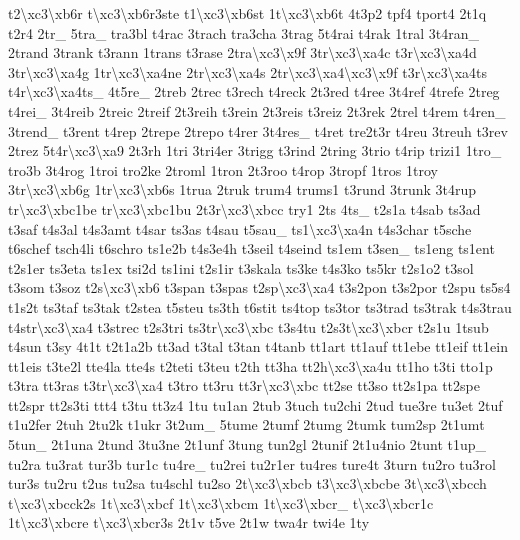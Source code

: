 {t2\textbackslash{}xc3\textbackslash{}xb6r t\textbackslash{}xc3\textbackslash{}xb6r3ste t1\textbackslash{}xc3\textbackslash{}xb6st 1t\textbackslash{}xc3\textbackslash{}xb6t 4t3p2 tpf4 tport4 2t1q t2r4 2tr\-\_\- 5tra\-\_\- tra3bl t4rac 3trach tra3cha 3trag 5t4rai t4rak 1tral 3t4ran\-\_\- 2trand 3trank t3rann 1trans t3rase 2tra\textbackslash{}xc3\textbackslash{}x9f 3tr\textbackslash{}xc3\textbackslash{}xa4c t3r\textbackslash{}xc3\textbackslash{}xa4d 3tr\textbackslash{}xc3\textbackslash{}xa4g 1tr\textbackslash{}xc3\textbackslash{}xa4ne 2tr\textbackslash{}xc3\textbackslash{}xa4s 2tr\textbackslash{}xc3\textbackslash{}xa4\textbackslash{}xc3\textbackslash{}x9f t3r\textbackslash{}xc3\textbackslash{}xa4ts t4r\textbackslash{}xc3\textbackslash{}xa4ts\-\_\- 4t5re\-\_\- 2treb 2trec t3rech t4reck 2t3red t4ree 3t4ref 4trefe 2treg t4rei\-\_\- 3t4reib 2treic 2treif 2t3reih t3rein 2t3reis t3reiz 2t3rek 2trel t4rem t4ren\-\_\- 3trend\-\_\- t3rent t4rep 2trepe 2trepo t4rer 3t4res\-\_\- t4ret tre2t3r t4reu 3treuh t3rev 2trez 5t4r\textbackslash{}xc3\textbackslash{}xa9 2t3rh 1tri 3tri4er 3trigg t3rind 2tring 3trio t4rip trizi1 1tro\-\_\- tro3b 3t4rog 1troi tro2ke 2troml 1tron 2t3roo t4rop 3tropf 1tros 1troy 3tr\textbackslash{}xc3\textbackslash{}xb6g 1tr\textbackslash{}xc3\textbackslash{}xb6s 1trua 2truk trum4 trums1 t3rund 3trunk 3t4rup tr\textbackslash{}xc3\textbackslash{}xbc1be tr\textbackslash{}xc3\textbackslash{}xbc1bu 2t3r\textbackslash{}xc3\textbackslash{}xbcc try1 2ts 4ts\-\_\- t2s1a t4sab ts3ad t3saf t4s3al t4s3amt t4sar ts3as t4sau t5sau\-\_\- ts1\textbackslash{}xc3\textbackslash{}xa4n t4s3char t5sche t6schef tsch4li t6schro ts1e2b t4s3e4h t3seil t4seind ts1em t3sen\-\_\- ts1eng ts1ent t2s1er ts3eta ts1ex tsi2d ts1ini t2s1ir t3skala ts3ke t4s3ko ts5kr t2s1o2 t3sol t3som t3soz t2s\textbackslash{}xc3\textbackslash{}xb6 t3span t3spas t2sp\textbackslash{}xc3\textbackslash{}xa4 t3s2pon t3s2por t2spu ts5s4 t1s2t ts3taf ts3tak t2stea t5steu ts3th t6stit ts4top ts3tor ts3trad ts3trak t4s3trau t4str\textbackslash{}xc3\textbackslash{}xa4 t3strec t2s3tri ts3tr\textbackslash{}xc3\textbackslash{}xbc t3s4tu t2s3t\textbackslash{}xc3\textbackslash{}xbcr t2s1u 1tsub t4sun t3sy 4t1t t2t1a2b tt3ad t3tal t3tan t4tanb tt1art tt1auf tt1ebe tt1eif tt1ein tt1eis t3te2l tte4la tte4s t2teti t3teu t2th tt3ha tt2h\textbackslash{}xc3\textbackslash{}xa4u tt1ho t3ti tto1p t3tra tt3ras t3tr\textbackslash{}xc3\textbackslash{}xa4 t3tro tt3ru tt3r\textbackslash{}xc3\textbackslash{}xbc tt2se tt3so tt2s1pa tt2spe tt2spr tt2s3ti ttt4 t3tu tt3z4 1tu tu1an 2tub 3tuch tu2chi 2tud tue3re tu3et 2tuf t1u2fer 2tuh 2tu2k t1ukr 3t2um\-\_\- 5tume 2tumf 2tumg 2tumk tum2sp 2t1umt 5tun\-\_\- 2t1una 2tund 3tu3ne 2t1unf 3tung tun2gl 2tunif 2t1u4nio 2tunt t1up\-\_\- tu2ra tu3rat tur3b tur1c tu4re\-\_\- tu2rei tu2r1er tu4res ture4t 3turn tu2ro tu3rol tur3s tu2ru t2us tu2sa tu4schl tu2so 2t\textbackslash{}xc3\textbackslash{}xbcb t3\textbackslash{}xc3\textbackslash{}xbcbe 3t\textbackslash{}xc3\textbackslash{}xbcch t\textbackslash{}xc3\textbackslash{}xbcck2s 1t\textbackslash{}xc3\textbackslash{}xbcf 1t\textbackslash{}xc3\textbackslash{}xbcm 1t\textbackslash{}xc3\textbackslash{}xbcr\-\_\- t\textbackslash{}xc3\textbackslash{}xbcr1c 1t\textbackslash{}xc3\textbackslash{}xbcre t\textbackslash{}xc3\textbackslash{}xbcr3s 2t1v t5ve 2t1w twa4r twi4e 1ty }
